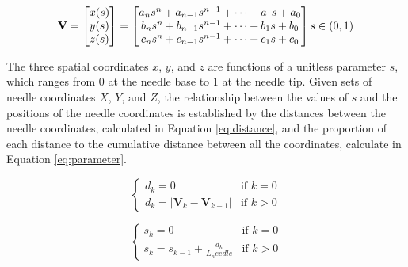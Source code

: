 \begin{equation}
\label{eq:curve_vector}
\textbf{V}=\begin{bmatrix}x(s) \\ y(s) \\ z(s) \end{bmatrix}=\begin{bmatrix}a_n s^n + a_{n-1} s^{n-1} + \dots + a_1 s + a_0 \\ b_n s^n + b_{n-1} s^{n-1} + \dots + b_1 s + b_0 \\ c_n s^n + c_{n-1} s^{n-1} + \dots + c_1 s + c_0 \end{bmatrix} \\
 s\in (0, 1)
 \end{equation}


The three spatial coordinates $x$, $y$, and $z$ are functions of a unitless parameter $s$, which ranges from 0 at the needle base to 1 at the needle tip. Given sets of needle coordinates $X$, $Y$, and $Z$, the relationship between the values of $s$ and the positions of the needle coordinates is established by the distances between the needle coordinates, calculated in Equation \ref{eq:distance}, and the proportion of each distance to the cumulative distance between all the coordinates, calculate in Equation \ref{eq:parameter}.

\begin{equation}
\label{eq:distance}
\begin{cases}
d_k = 0 &\mbox{if } k=0 \\
d_k = \lvert \textbf{V}_k - \textbf{V}_{k-1}\rvert &\mbox{if } k>0
\end{cases}
\end{equation}

\begin{equation}
\label{eq:parameter}
\begin{cases}
s_k = 0 &\mbox{if } k=0 \\
s_k = s_{k-1} + \frac{d_k}{L_needle}&\mbox{if } k>0
\end{cases}
\end{equation}

